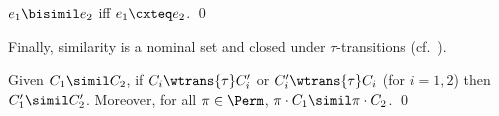 
\begin{theorem}\label{theorem:SC}
  $e_1 \bisimil e_2$ iff $e_1 \cxteq e_2$.  %
\qed\end{theorem}




% 
% 
% 

Finally,  similarity is a nominal set and closed under $\tau$-transitions (cf.~\cite{KoutavasLT22}).
\begin{lemma}\label{lem:closures}
  Given $C_1\simil C_2$, %
  if $C_i\wtrans{\tau}C_i'$ or
  $C_i'\wtrans{\tau}C_i$ (for $i=1,2$) then $C_1'\simil C_2'$.
  Moreover, for all $\pi\in\Perm$, $\pi\cdot C_1\simil \pi\cdot C_2$.
\qed\end{lemma}


